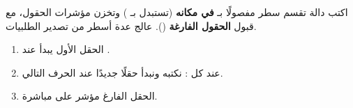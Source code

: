 \begin{statement}
اكتب دالة  تقسم سطر  مفصولًا بـ \code{;} \textbf{في مكانه} (تستبدل \code{;} بـ ) وتخزن مؤشرات الحقول، مع قبول \textbf{الحقول الفارغة} (\code{;;}). عالج عدة أسطر من تصدير الطلبيات.
\end{statement}
\begin{stepsbox}\begin{enumerate}
\item الحقل الأول يبدأ عند .
\item عند كل \code{;}: نكتبه  ونبدأ حقلًا جديدًا عند الحرف التالي.
\item الحقل الفارغ مؤشر على  مباشرة.
\end{enumerate}\end{stepsbox}

